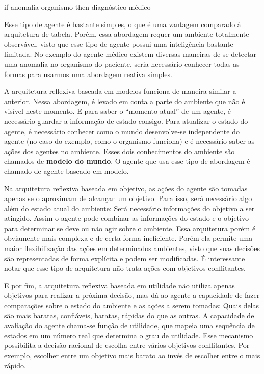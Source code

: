 if anomalia-organismo then diagnóstico-médico

Esse tipo de agente é bastante simples, o que é uma vantagem comparado à arquitetura de tabela. Porém, essa abordagem requer um ambiente totalmente observável, visto que esse tipo de agente possui uma inteligência bastante limitada. No exemplo do agente médico existem diversas maneiras de se detectar uma anomalia no organismo do paciente, seria necessário conhecer todas as formas para usarmos uma abordagem reativa simples.

A arquitetura reflexiva baseada em modelos funciona de maneira similar a anterior. Nessa abordagem, é levado em conta a parte do ambiente que não é visível neste momento. E para saber o ``momento atual'' de um agente, é necessário guardar a informação de estado consigo. Para atualizar o estado do agente, é necessário conhecer como o mundo desenvolve-se independente do agente (no caso do exemplo, como o organismo funciona) e é necessário saber as ações dos agentes no ambiente. Esses dois conhecimentos do ambiente são chamados de \textbf{modelo do mundo}. O agente que usa esse tipo de abordagem é chamado de agente baseado em modelo.

Na arquitetura reflexiva baseada em objetivo, as ações do agente são tomadas apenas se o aproximam de alcançar um objetivo. Para isso, será necessário algo além do estado atual do ambiente: Será necessário informações do objetivo a ser atingido. Assim o agente pode combinar as informações do estado e o objetivo para determinar se deve ou não agir sobre o ambiente. Essa arquitetura porém é obviamente mais complexa e de certa forma ineficiente. Porém ela permite uma maior flexibilização das ações em determinados ambientes, visto que suas decisões são representadas de forma explícita e podem ser modificadas. É interessante notar que esse tipo de arquitetura não trata ações com objetivos conflitantes.

E por fim, a arquitetura reflexiva baseada em utilidade não utiliza apenas objetivos para realizar a próxima decisão, mas dá ao agente a capacidade de fazer comparações sobre o estado do ambiente e as ações a serem tomadas: Quais delas são mais baratas, confiáveis, baratas, rápidas do que as outras. A capacidade de avaliação do agente chama-se função de utilidade, que mapeia uma sequência de estados em um número real que determina o grau de utilidade. Esse mecanismo possibilita a decisão racional de escolha entre vários objetivos conflitantes. Por exemplo, escolher entre um objetivo mais barato ao invés de escolher entre o mais rápido.

